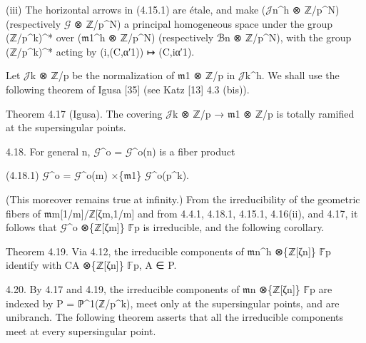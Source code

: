 \documentclass[11pt,a4paper]{article}
\begin{document}
(iii) The horizontal arrows in (4.15.1) are étale, and make (\ensuremath{\mathcal{J}}\textunderscore{}n\textasciicircum{}h ⊗ ℤ/p\textasciicircum{}N) (respectively \ensuremath{\mathcal{G}} ⊗ ℤ/p\textasciicircum{}N) a principal homogeneous space under the group (ℤ/p\textasciicircum{}k)\textasciicircum{}* over (\ensuremath{\mathfrak{m}}\textunderscore{}1\textasciicircum{}h ⊗ ℤ/p\textasciicircum{}N) (respectively ℬ\textunderscore{}n ⊗ ℤ/p\textasciicircum{}N), with the group (ℤ/p\textasciicircum{}k)\textasciicircum{}* acting by (i,(C,α′\textunderscore{}1)) ↦ (C,iα′\textunderscore{}1).

Let \ensuremath{\mathcal{J}}\textunderscore{}k ⊗ ℤ/p be the normalization of \ensuremath{\mathfrak{m}}\textunderscore{}1 ⊗ ℤ/p in \ensuremath{\mathcal{J}}\textunderscore{}k\textasciicircum{}h. We shall use the following theorem of Igusa [35] (see Katz [13] 4.3 (bis)).

Theorem 4.17 (Igusa). The covering \ensuremath{\mathcal{J}}\textunderscore{}k ⊗ ℤ/p → \ensuremath{\mathfrak{m}}\textunderscore{}1 ⊗ ℤ/p is totally ramified at the supersingular points.

4.18. For general n, \ensuremath{\mathcal{G}}\textasciicircum{}o = \ensuremath{\mathcal{G}}\textasciicircum{}o(n) is a fiber product

(4.18.1)        \ensuremath{\mathcal{G}}\textasciicircum{}o = \ensuremath{\mathcal{G}}\textasciicircum{}o(m) ×\textunderscore{}\{\ensuremath{\mathfrak{m}}\textunderscore{}1\} \ensuremath{\mathcal{G}}\textasciicircum{}o(p\textasciicircum{}k).

(This moreover remains true at infinity.) From the irreducibility of the geometric fibers of \ensuremath{\mathfrak{m}}\textunderscore{}m[1/m]/ℤ[ζ\textunderscore{}m,1/m] and from 4.4.1, 4.18.1, 4.15.1, 4.16(ii), and 4.17, it follows that \ensuremath{\mathcal{G}}\textasciicircum{}o ⊗\textunderscore{}\{ℤ[ζ\textunderscore{}m]\} \ensuremath{\mathbb{F}}̄\textunderscore{}p is irreducible, and the following corollary.

Theorem 4.19. Via 4.12, the irreducible components of \ensuremath{\mathfrak{m}}\textunderscore{}n\textasciicircum{}h ⊗\textunderscore{}\{ℤ[ζ\textunderscore{}n]\} \ensuremath{\mathbb{F}}̄\textunderscore{}p identify with C\textunderscore{}A ⊗\textunderscore{}\{ℤ[ζ\textunderscore{}n]\} \ensuremath{\mathbb{F}}\textunderscore{}p, A ∈ P.

4.20. By 4.17 and 4.19, the irreducible components of \ensuremath{\mathfrak{m}}\textunderscore{}n ⊗\textunderscore{}\{ℤ[ζ\textunderscore{}n]\} \ensuremath{\mathbb{F}}̄\textunderscore{}p are indexed by P = ℙ\textasciicircum{}1(ℤ/p\textasciicircum{}k), meet only at the supersingular points, and are unibranch. The following theorem asserts that all the irreducible components meet at every supersingular point.
\end{document}
